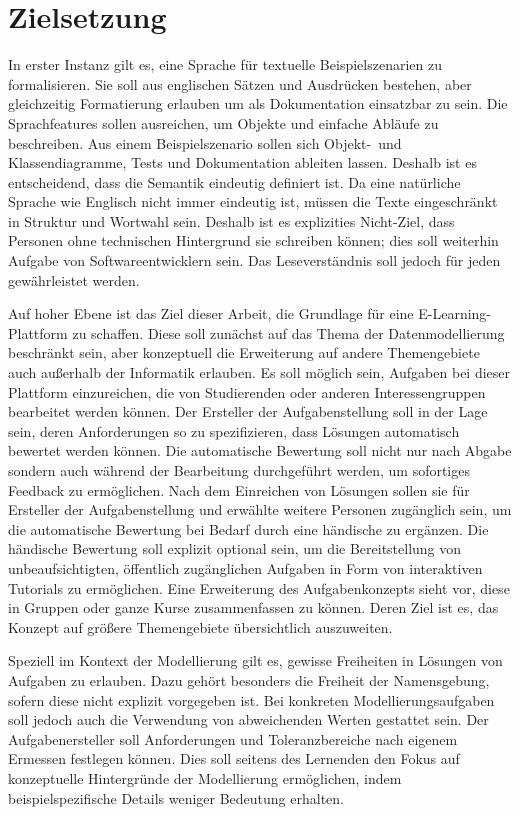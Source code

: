 \chapter{Zielsetzung}\label{ch:goals}

In erster Instanz gilt es, eine Sprache für textuelle Beispielszenarien zu formalisieren.
Sie soll aus englischen Sätzen und Ausdrücken bestehen, aber gleichzeitig Formatierung erlauben um als Dokumentation einsatzbar zu sein.
Die Sprachfeatures sollen ausreichen, um Objekte und einfache Abläufe zu beschreiben.
Aus einem Beispielszenario sollen sich Objekt-\ und Klassendiagramme, Tests und Dokumentation ableiten lassen.
Deshalb ist es entscheidend, dass die Semantik eindeutig definiert ist.
Da eine natürliche Sprache wie Englisch nicht immer eindeutig ist, müssen die Texte eingeschränkt in Struktur und Wortwahl sein.
Deshalb ist es explizities Nicht-Ziel, dass Personen ohne technischen Hintergrund sie schreiben können;
dies soll weiterhin Aufgabe von Softwareentwicklern sein.
Das Leseverständnis soll jedoch für jeden gewährleistet werden.

Auf hoher Ebene ist das Ziel dieser Arbeit, die Grundlage für eine E-Learning-Plattform zu schaffen.
Diese soll zunächst auf das Thema der Datenmodellierung beschränkt sein, aber konzeptuell die Erweiterung auf andere Themengebiete auch außerhalb der Informatik erlauben.
Es soll möglich sein, Aufgaben bei dieser Plattform einzureichen, die von Studierenden oder anderen Interessengruppen bearbeitet werden können.
Der Ersteller der Aufgabenstellung soll in der Lage sein, deren Anforderungen so zu spezifizieren, dass Lösungen automatisch bewertet werden können.
Die automatische Bewertung soll nicht nur nach Abgabe sondern auch während der Bearbeitung durchgeführt werden, um sofortiges Feedback zu ermöglichen.
Nach dem Einreichen von Lösungen sollen sie für Ersteller der Aufgabenstellung und erwählte weitere Personen zugänglich sein, um die automatische Bewertung bei Bedarf durch eine händische zu ergänzen.
Die händische Bewertung soll explizit optional sein, um die Bereitstellung von unbeaufsichtigten, öffentlich zugänglichen Aufgaben in Form von interaktiven Tutorials zu ermöglichen.
Eine Erweiterung des Aufgabenkonzepts sieht vor, diese in Gruppen oder ganze Kurse zusammenfassen zu können.
Deren Ziel ist es, das Konzept auf größere Themengebiete übersichtlich auszuweiten.

Speziell im Kontext der Modellierung gilt es, gewisse Freiheiten in Lösungen von Aufgaben zu erlauben.
Dazu gehört besonders die Freiheit der Namensgebung, sofern diese nicht explizit vorgegeben ist.
Bei konkreten Modellierungsaufgaben soll jedoch auch die Verwendung von abweichenden Werten gestattet sein.
Der Aufgabenersteller soll Anforderungen und Toleranzbereiche nach eigenem Ermessen festlegen können.
Dies soll seitens des Lernenden den Fokus auf konzeptuelle Hintergründe der Modellierung ermöglichen, indem beispielspezifische Details weniger Bedeutung erhalten.
